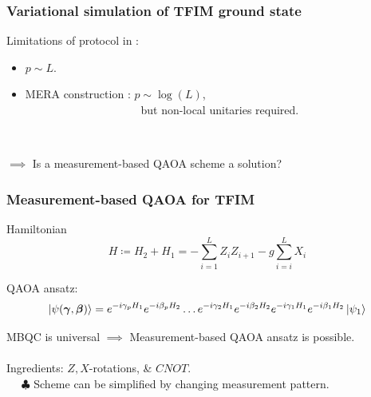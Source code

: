 \documentclass{beamer}
\theoremstyle{definition}
\begin{document}

\begin{frame}
\frametitle{Variational simulation of TFIM ground state}


Limitations of protocol in \cite{VQCS}: 
\begin{itemize}
	
	
	\item  $p \sim L$.
	
	\item MERA construction \cite{MERA}: $p\sim \log(L)$, \\
	$\quad\quad\quad\quad\quad\quad\qquad\qquad$ but non-local unitaries required.
\end{itemize}

$\,$\\

\pause

$\implies$ Is a measurement-based QAOA scheme a solution?






\end{frame}








\begin{frame}
\frametitle{Measurement-based QAOA for TFIM}

Hamiltonian
\begin{equation*}
H \coloneqq H_2 + H_1 =  - \sum_{i=1}^L Z_i Z_{i+1} - g\sum^L_{i=i}X_i
\end{equation*}


QAOA ansatz:
\begin{equation*}
\left\vert{\psi(\bm{\gamma}, \bm{\beta})}\right\rangle =  \strut {e^{-i\gamma_p H_1}e^{-i\beta_p H_2}} \dots {e^{-i\gamma_2 H_1}e^{-i\beta_2 H_2}} {e^{-i\gamma_1 H_1}e^{-i\beta_1 H_2}} \left\vert{\psi_1}\right\rangle
\end{equation*}

MBQC is universal $\implies$ Measurement-based QAOA ansatz is possible. \\

$\,$\\

Ingredients: $Z,X$-rotations, \& $CNOT$. \\

$\quad$ $\clubsuit$ Scheme can be simplified by changing measurement pattern.  






\end{frame}
\end{document}
